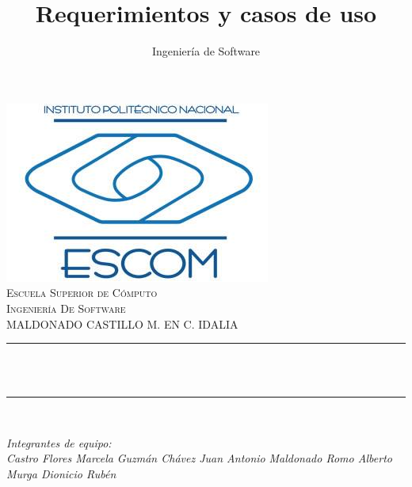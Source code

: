 \documentclass[12pt]{article}
\title{Requerimientos y casos de uso}					%
\author{Ingeniería de Software}					%
\makeatletter
\let\thetitle\@title
\let\theauthor\@author
\makeatother
\begin{document}

\begin{titlepage}
	\centering
    \vspace*{0.0 cm}
    \includegraphics[scale = 0.5]{fotoEscudoESCOM.jpg}\\[.0 cm]	%
    \textsc{\LARGE Escuela Superior de Cómputo}\\[2.0 cm]	%
	\textsc{\Large Ingeniería De Software}\\[0.5 cm]				%
	\textsc{\large  MALDONADO CASTILLO M. EN C. IDALIA}\\[0.5 cm]		%
	\rule{\linewidth}{0.2 mm} \\[0.4 cm]
	{ \huge \bfseries \thetitle}\\
	\rule{\linewidth}{0.2 mm} \\[1.5 cm]
	
	\begin{minipage}{0.4\textwidth}
		\begin{center} \large
			\emph{Integrantes de equipo:}\\
            \emph{Castro Flores Marcela}
            \emph{Guzmán Chávez Juan Antonio}
            \emph{Maldonado Romo Alberto}
            \emph{Murga Dionicio Rubén}
            \emph{}
			\theauthor\linebreak
			\end{center}
	\end{minipage}\\[2 cm] 
	\vfill
	
\end{titlepage}


\tableofcontents
\pagebreak

\end{document}
